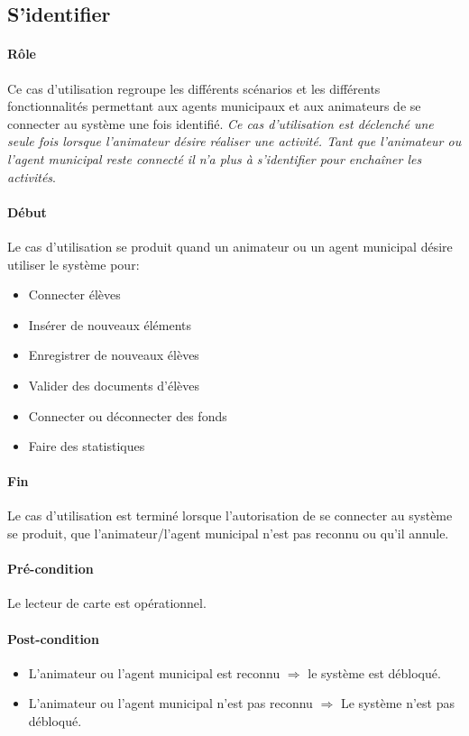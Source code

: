 \documentclass{article}
\begin{document}
		\subsection{S'identifier}
		\paragraph{Rôle}
			Ce cas d'utilisation regroupe les différents scénarios et les différents fonctionnalités
			permettant aux agents municipaux et aux animateurs de se connecter au système une fois 
			identifié. \textit{Ce cas d'utilisation est déclenché une seule fois lorsque l'animateur
			désire réaliser une activité. Tant que l'animateur ou l'agent municipal reste connecté
			il n'a plus à s'identifier pour enchaîner les activités}.
		\paragraph{Début}
			Le cas d'utilisation se produit quand un animateur ou un agent municipal désire utiliser
			le système pour:
			\begin{itemize}
				\item Connecter élèves
				\item Insérer de nouveaux éléments
				\item Enregistrer de nouveaux élèves
				\item Valider des documents d'élèves
				\item Connecter ou déconnecter des fonds
				\item Faire des statistiques
			\end{itemize}

		\paragraph{Fin}
			Le cas d'utilisation est terminé lorsque l'autorisation de se connecter au système se 
			produit, que l'animateur/l'agent municipal n'est pas reconnu ou qu'il annule. 
		\paragraph{Pré-condition}
			Le lecteur de carte est opérationnel.	
		\paragraph{Post-condition}
		\begin{itemize}
			\item L'animateur ou l'agent municipal est reconnu $\Rightarrow$ le système est débloqué.	
			\item L'animateur ou l'agent municipal n'est pas reconnu $\Rightarrow$ Le système n'est pas débloqué.
		\end{itemize}
\end{document}
